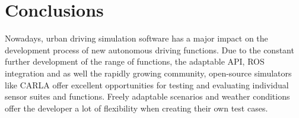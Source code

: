 \section{Conclusions}
	 Nowadays, urban driving simulation software has a major impact on the development process of new autonomous driving functions. Due to the constant further development of the range of functions, the adaptable \ac{API}, \ac{ROS} integration and as well the rapidly growing community, open-source simulators like CARLA offer excellent opportunities for testing and evaluating individual sensor suites and functions. Freely adaptable scenarios and weather conditions offer the developer a lot of flexibility when creating their own test cases.